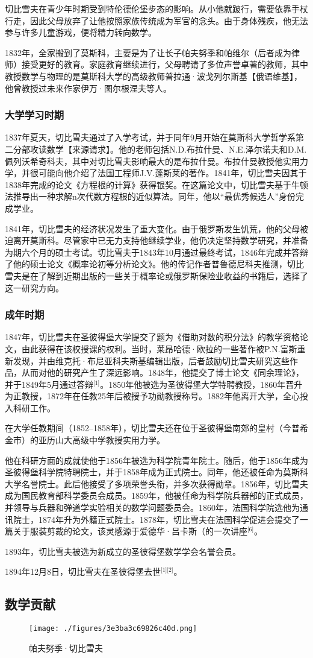切比雪夫在青少年时期受到特伦德伦堡步态的影响。从小他就跛行，需要依靠手杖行走，因此父母放弃了让他按照家族传统成为军官的念头。由于身体残疾，他无法参与许多儿童游戏，便将精力转向数学。

1832年，全家搬到了莫斯科，主要是为了让长子帕夫努季和帕维尔（后者成为律师）接受更好的教育。家庭教育继续进行，父母聘请了多位声誉卓著的教师，其中教授数学与物理的是莫斯科大学的高级教师普拉通·波戈列尔斯基【俄语维基】，他曾教授过未来作家伊万·图尔根涅夫等人。
\subsubsection{大学学习时期}
1837年夏天，切比雪夫通过了入学考试，并于同年9月开始在莫斯科大学哲学系第二分部攻读数学【来源请求】。他的老师包括N.D.布拉什曼、N.E.泽尔诺夫和D.M.佩列沃希奇科夫，其中对切比雪夫影响最大的是布拉什曼。布拉什曼教授他实用力学，并很可能向他介绍了法国工程师J.V.蓬斯莱的著作。1841年，切比雪夫因其于1838年完成的论文《方程根的计算》获得银奖。在这篇论文中，切比雪夫基于牛顿法推导出一种求解n次代数方程根的近似算法。同年，他以“最优秀候选人”身份完成学业。

1841年，切比雪夫的经济状况发生了重大变化。由于俄罗斯发生饥荒，他的父母被迫离开莫斯科。尽管家中已无力支持他继续学业，他仍决定坚持数学研究，并准备为期六个月的硕士考试。切比雪夫于1843年10月通过最终考试，1846年完成并答辩了他的硕士论文《概率论初等分析论文》。他的传记作者普鲁德尼科夫推测，切比雪夫是在了解到近期出版的一些关于概率论或俄罗斯保险业收益的书籍后，选择了这一研究方向。
\subsubsection{成年时期}
1847年，切比雪夫在圣彼得堡大学提交了题为《借助对数的积分法》的教学资格论文，由此获得在该校授课的权利。当时，莱昂哈德·欧拉的一些著作被P.N.富斯重新发现，并由维克托·布尼亚科夫斯基编辑出版，后者鼓励切比雪夫研究这些作品，从而对他的研究产生了深远影响。1848年，他提交了博士论文《同余理论》，并于1849年5月通过答辩\(^\text{[1]}\)。1850年他被选为圣彼得堡大学特聘教授，1860年晋升为正教授，1872年在任教25年后被授予功勋教授称号。1882年他离开大学，全心投入科研工作。

在大学任教期间（1852–1858年），切比雪夫还在位于圣彼得堡南郊的皇村（今普希金市）的亚历山大高级中学教授实用力学。

他在科研方面的成就使他于1856年被选为科学院青年院士。随后，他于1856年成为圣彼得堡科学院特聘院士，并于1858年成为正式院士。同年，他还被任命为莫斯科大学名誉院士。此后他接受了多项荣誉头衔，并多次获得勋章。1856年，切比雪夫成为国民教育部科学委员会成员。1859年，他被任命为科学院兵器部的正式成员，并领导与兵器和弹道学实验相关的数学问题委员会。1860年，法国科学院选他为通讯院士，1874年升为外籍正式院士。1878年，切比雪夫在法国科学促进会提交了一篇关于服装剪裁的论文，该灵感源于爱德华·吕卡斯（的一次讲座\(^\text{[6]}\)。

1893年，切比雪夫被选为新成立的圣彼得堡数学学会名誉会员。

1894年12月8日，切比雪夫在圣彼得堡去世\(^\text{[1][2]}\)。
\subsection{数学贡献}
\begin{figure}[ht]
\centering
\texttt{[image: ./figures/3e3ba3c69826c40d.png]}
\caption{帕夫努季·切比雪夫} \label{fig_PFNJ_2}
\end{figure}